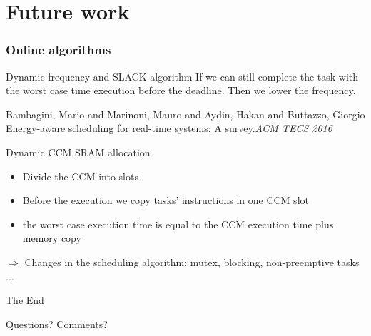 \documentclass[
	11pt, %
]{beamer}
\begin{document}
\section{Future work}
\begin{frame}
	\frametitle{Online algorithms}
	\begin{block}{Dynamic frequency and SLACK algorithm}
		If we can still complete the task with the worst case time execution before the deadline. Then we lower the frequency. 
		\begin{thebibliography}{10}
			{\tiny
			\bibitem{} Bambagini, Mario and Marinoni, Mauro and Aydin, Hakan and Buttazzo, Giorgio
			\newblock Energy-aware scheduling for real-time systems: A survey.{\em{ACM TECS 2016}}
			}
		\end{thebibliography}
	\end{block}
	\begin{block}{Dynamic CCM SRAM allocation}
		\begin{itemize}
			\item Divide the CCM into slots
			\item Before the execution we copy tasks' instructions in one CCM slot
			\item the worst case execution time is equal to the CCM execution time plus memory copy
			
		\end{itemize}
		$\Rightarrow$ Changes in the scheduling algorithm: mutex, blocking, non-preemptive tasks $\ldots$

	\end{block}
\end{frame}





\begin{frame}[plain] %
	\begin{center}
		{\Huge The End}
		
		\bigskip\bigskip %
		
		{\LARGE Questions? Comments?}
	\end{center}
\end{frame}

\end{document}
